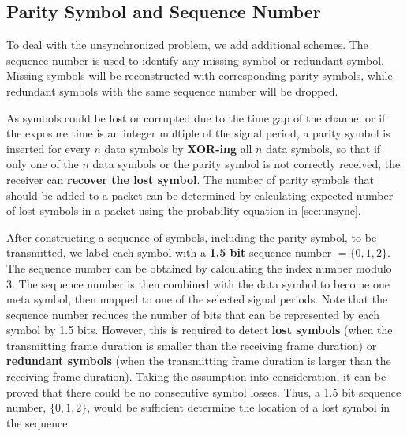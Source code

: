 \subsection{Parity Symbol and Sequence Number}
To deal with the unsynchronized problem, we add additional schemes.
The sequence number is used to identify any missing symbol or redundant symbol. Missing symbols will be reconstructed with corresponding parity symbols, while redundant symbols with the same sequence number will be dropped.

As symbols could be lost or corrupted due to the time gap of the channel or if the exposure time is an integer multiple of the signal period,
a parity symbol is inserted for every $n$ data symbols by \textbf{XOR-ing} all $n$ data symbols, so that if only one of the $n$ data symbols or the parity symbol is not correctly received, the receiver can \textbf{recover the lost symbol}. The number of parity symbols that should be added to a packet can be determined by calculating expected number of lost symbols in a packet using the probability equation in \autoref{sec:unsync}. 

After constructing a sequence of symbols, including the parity symbol, to be transmitted, we label each symbol with a \textbf{1.5 bit} sequence number $=\{0,1,2\}$.
The sequence number can be obtained by calculating the index number modulo 3.
The sequence number is then combined with the data symbol to become one meta symbol, then mapped to one of the selected signal periods.
Note that the sequence number reduces the number of bits that can be represented by each symbol by 1.5 bits. However, this is required to detect \textbf{lost symbols} (when the transmitting frame duration is smaller than the receiving frame duration) or \textbf{redundant symbols} (when the transmitting frame duration is larger than the receiving frame duration).
Taking the assumption into consideration, it can be proved that there could be no consecutive symbol losses. Thus, a 1.5 bit sequence number, $\{0,1,2\}$, would be sufficient determine the location of a lost symbol in the sequence. 

